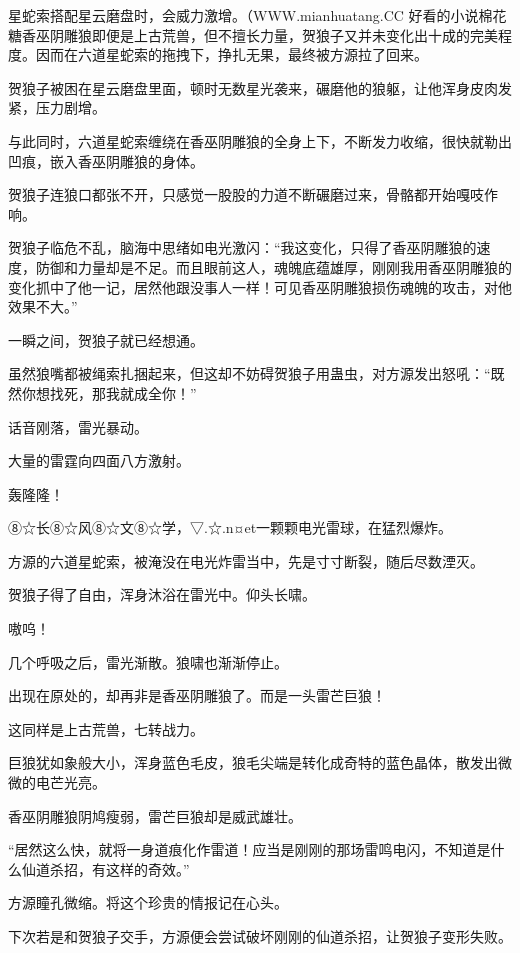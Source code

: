 
\begin{this_body}

星蛇索搭配星云磨盘时，会威力激增。（WWW.mianhuatang.CC 好看的小说棉花糖香巫阴雕狼即便是上古荒兽，但不擅长力量，贺狼子又并未变化出十成的完美程度。因而在六道星蛇索的拖拽下，挣扎无果，最终被方源拉了回来。

贺狼子被困在星云磨盘里面，顿时无数星光袭来，碾磨他的狼躯，让他浑身皮肉发紧，压力剧增。

与此同时，六道星蛇索缠绕在香巫阴雕狼的全身上下，不断发力收缩，很快就勒出凹痕，嵌入香巫阴雕狼的身体。

贺狼子连狼口都张不开，只感觉一股股的力道不断碾磨过来，骨骼都开始嘎吱作响。

贺狼子临危不乱，脑海中思绪如电光激闪：“我这变化，只得了香巫阴雕狼的速度，防御和力量却是不足。而且眼前这人，魂魄底蕴雄厚，刚刚我用香巫阴雕狼的变化抓中了他一记，居然他跟没事人一样！可见香巫阴雕狼损伤魂魄的攻击，对他效果不大。”

一瞬之间，贺狼子就已经想通。

虽然狼嘴都被绳索扎捆起来，但这却不妨碍贺狼子用蛊虫，对方源发出怒吼：“既然你想找死，那我就成全你！”

话音刚落，雷光暴动。

大量的雷霆向四面八方激射。

轰隆隆！

⑧☆长⑧☆风⑧☆文⑧☆学，▽.☆.n¤et一颗颗电光雷球，在猛烈爆炸。

方源的六道星蛇索，被淹没在电光炸雷当中，先是寸寸断裂，随后尽数湮灭。

贺狼子得了自由，浑身沐浴在雷光中。仰头长啸。

嗷呜！

几个呼吸之后，雷光渐散。狼啸也渐渐停止。

出现在原处的，却再非是香巫阴雕狼了。而是一头雷芒巨狼！

这同样是上古荒兽，七转战力。

巨狼犹如象般大小，浑身蓝色毛皮，狼毛尖端是转化成奇特的蓝色晶体，散发出微微的电芒光亮。

香巫阴雕狼阴鸠瘦弱，雷芒巨狼却是威武雄壮。

“居然这么快，就将一身道痕化作雷道！应当是刚刚的那场雷鸣电闪，不知道是什么仙道杀招，有这样的奇效。”

方源瞳孔微缩。将这个珍贵的情报记在心头。

下次若是和贺狼子交手，方源便会尝试破坏刚刚的仙道杀招，让贺狼子变形失败。


\end{this_body}
